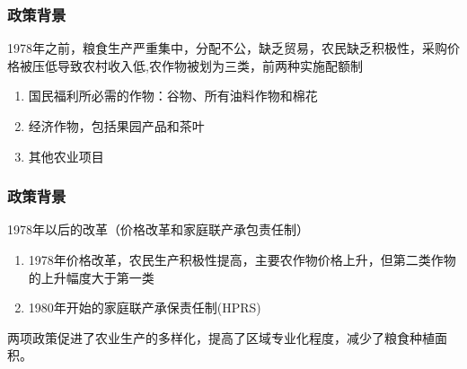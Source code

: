 \documentclass{beamer}
\begin{document}


\begin{frame}
\frametitle{政策背景}
    1978年之前，粮食生产严重集中，分配不公，缺乏贸易，农民缺乏积极性，采购价格被压低导致农村收入低,农作物被划为三类，前两种实施配额制
    \begin{enumerate} 
	\item 国民福利所必需的作物：谷物、所有油料作物和棉花
	\item 经济作物，包括果园产品和茶叶
	\item 其他农业项目
\end{enumerate}
\end{frame}

\begin{frame}
	\frametitle{政策背景}
1978年以后的改革（价格改革和家庭联产承包责任制）
\begin{enumerate}
	\item 1978年价格改革，农民生产积极性提高，主要农作物价格上升，但第二类作物的上升幅度大于第一类
	\item 1980年开始的家庭联产承保责任制(HPRS)
\end{enumerate}
两项政策促进了农业生产的多样化，提高了区域专业化程度，减少了粮食种植面积。

\end{frame}

%
%            
%
\end{document}
